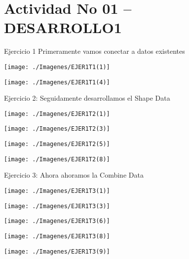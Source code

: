  \section{Actividad No 01 – DESARROLLO1} 
Ejercicio 1  Primeramente vamos conectar a datos existentes \\
	\begin{center}
	\texttt{[image: ./Imagenes/EJER1T1(1)]}
	\end{center}	

	\begin{center}
	\texttt{[image: ./Imagenes/EJER1T1(4)]}
	\end{center}
	\newpage
	
Ejercicio 2: Seguidamente desarrollamos el Shape Data\\
	\begin{center}
	\texttt{[image: ./Imagenes/EJER1T2(1)]}
	\end{center}	

	

	\begin{center}
	\texttt{[image: ./Imagenes/EJER1T2(3)]}
	\end{center}	
\newpage

	\begin{center}
	\texttt{[image: ./Imagenes/EJER1T2(5)]}
	\end{center}	

	\begin{center}
	\texttt{[image: ./Imagenes/EJER1T2(8)]}
	\end{center}	
\newpage

Ejercicio 3: Ahora ahoramos la Combine Data\\
	\begin{center}
	\texttt{[image: ./Imagenes/EJER1T3(1)]}
	\end{center}	

	\begin{center}
	\texttt{[image: ./Imagenes/EJER1T3(3)]}
	\end{center}	
\newpage
	

	\begin{center}
	\texttt{[image: ./Imagenes/EJER1T3(6)]}
	\end{center}	
	

	\begin{center}
	\texttt{[image: ./Imagenes/EJER1T3(8)]}
	\end{center}	
\newpage
	\begin{center}
	\texttt{[image: ./Imagenes/EJER1T3(9)]}
	\end{center}	


